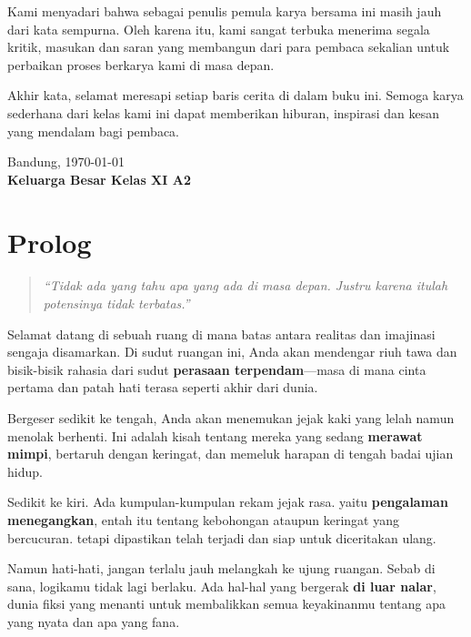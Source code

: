 \documentclass[11pt, openany, a5paper]{memoir}
\begin{document}
Kami menyadari bahwa sebagai penulis pemula karya bersama ini masih jauh dari kata sempurna. Oleh karena itu, kami sangat terbuka menerima segala kritik, masukan dan saran yang membangun dari para pembaca sekalian untuk perbaikan proses berkarya kami di masa depan.


Akhir kata, selamat meresapi setiap baris cerita di dalam buku ini. Semoga karya sederhana dari kelas kami ini dapat memberikan hiburan, inspirasi dan kesan yang mendalam bagi pembaca.

\vspace{2em}
\begin{flushright}
  Bandung, \today \\
  \vspace{1.5em}
  \textbf{Keluarga Besar Kelas XI A2}
\end{flushright}
\clearpage

{
  \renewcommand{\contentsname}{\normalfont\Huge\centering\scshape Daftar Isi}
  \tableofcontents*
}
\clearpage

\newpage

\chapter*{Prolog}

\begin{quotation}
  \textit{``Tidak ada yang tahu apa yang ada di masa depan. Justru karena itulah potensinya tidak terbatas.''}
\end{quotation}
Selamat datang di sebuah ruang di mana batas antara realitas dan imajinasi sengaja disamarkan. Di sudut ruangan ini, Anda akan mendengar riuh tawa dan bisik-bisik rahasia dari sudut \textbf{perasaan terpendam}---masa di mana cinta pertama dan patah hati terasa seperti akhir dari dunia.


Bergeser sedikit ke tengah, Anda akan menemukan jejak kaki yang lelah namun menolak berhenti. Ini adalah kisah tentang mereka yang sedang \textbf{merawat mimpi}, bertaruh dengan keringat, dan memeluk harapan di tengah badai ujian hidup.


Sedikit ke kiri. Ada kumpulan-kumpulan rekam jejak rasa. yaitu \textbf{pengalaman menegangkan}, entah itu tentang kebohongan ataupun keringat yang bercucuran. tetapi dipastikan telah terjadi dan siap untuk diceritakan ulang.


Namun hati-hati, jangan terlalu jauh melangkah ke ujung ruangan. Sebab di sana, logikamu tidak lagi berlaku. Ada hal-hal yang bergerak \textbf{di luar nalar}, dunia fiksi yang menanti untuk membalikkan semua keyakinanmu tentang apa yang nyata dan apa yang fana.
\end{document}
